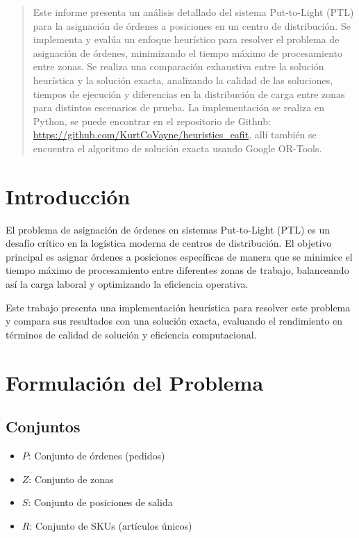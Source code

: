 \documentclass{hw-template}
\begin{document}
\maketitle

\begin{abstract}
Este informe presenta un análisis detallado del sistema Put-to-Light (PTL) para la asignación de órdenes a posiciones en un centro de distribución. Se implementa y evalúa un enfoque heurístico para resolver el problema de asignación de órdenes, minimizando el tiempo máximo de procesamiento entre zonas. Se realiza una comparación exhaustiva entre la solución heurística y la solución exacta, analizando la calidad de las soluciones, tiempos de ejecución y diferencias en la distribución de carga entre zonas para distintos escenarios de prueba. La implementación se realiza en Python, se puede encontrar en el repositorio de Github: \url{
    https://github.com/KurtCoVayne/heuristics_eafit}, allí también se encuentra el algoritmo de solución exacta usando Google OR-Tools.
\end{abstract}

\tableofcontents

\section{Introducción}

El problema de asignación de órdenes en sistemas Put-to-Light (PTL) es un desafío crítico en la logística moderna de centros de distribución. El objetivo principal es asignar órdenes a posiciones específicas de manera que se minimice el tiempo máximo de procesamiento entre diferentes zonas de trabajo, balanceando así la carga laboral y optimizando la eficiencia operativa.

Este trabajo presenta una implementación heurística para resolver este problema y compara sus resultados con una solución exacta, evaluando el rendimiento en términos de calidad de solución y eficiencia computacional.

\section{Formulación del Problema}


\subsection{Conjuntos}
\begin{itemize}
    \item $P$: Conjunto de órdenes (pedidos)
    \item $Z$: Conjunto de zonas
    \item $S$: Conjunto de posiciones de salida
    \item $R$: Conjunto de SKUs (artículos únicos)
\end{itemize}
\end{document}
